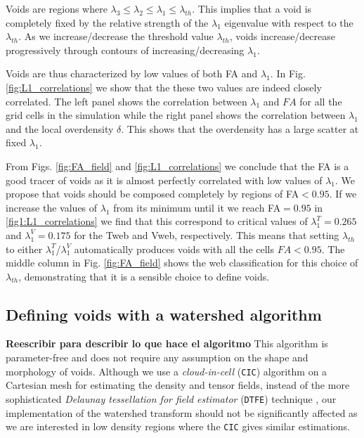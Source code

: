 \documentclass[a4,useAMS,usenatbib,usegraphicx]{latex/mn2e}
\begin{document}
Voids are regions where $\lambda_3\leq\lambda_2\leq
\lambda_1\leq\lambda_{th}$. 
This implies that a void is completely fixed by the relative strength
of the $\lambda_1$ eigenvalue with respect to the $\lambda_{th}$.   
As we  increase/decrease the threshold value $\lambda_{th}$, voids
increase/decrease progressively through contours of
increasing/decreasing $\lambda_1$.   
 
Voids are thus characterized by low values of both FA and
$\lambda_1$. 
In Fig. \ref{fig:L1_correlations} we show that the these two values
are indeed closely correlated.  
The left panel shows the correlation between $\lambda_1$ and $FA$ for
all the grid cells in the simulation while the right panel shows the
correlation between $\lambda_1$ and the local overdensity $\delta$.  
This shows that the overdensity has a large scatter at fixed
$\lambda_1$. 

From Figs. \ref{fig:FA_field} and \ref{fig:L1_correlations} we
conclude that the FA is a good tracer of voids as it is almost perfectly
correlated with low values of $\lambda_1$. 
We propose that voids should be composed completely by regions of
FA$<0.95$.
If we increase the values of $\lambda_1$ from its minimum until it
we reach FA$=0.95$ in \ref{fig1:L1_correlations} we find that this
correspond to critical values of $\lambda_{1}^T = 0.265$ and
$\lambda_{1}^V = 0.175$ for the Tweb and Vweb, respectively.
This means that setting $\lambda_{th}$ to either
$\lambda_{1}^T$/$\lambda_{1}^{V}$ automatically produces voids with
all the cells $FA<0.95$.   
The middle column in Fig. \ref{fig:FA_field} shows the web
classification for this choice of $\lambda_{th}$, demonstrating that
it is a sensible choice to define voids. 

   


\subsection{Defining voids with a watershed algorithm}
\label{sec:watershed}

{\bf Reescribir para describir lo que hace el algoritmo}
This algorithm is parameter-free and does  not require any assumption
on the shape and morphology of voids.  
Although we use a \textit{cloud-in-cell} (\texttt{CIC}) algorithm on a 
Cartesian mesh for estimating the density and tensor fields, instead of 
the more sophisticated \textit{Delaunay tessellation for field estimator} 
(\texttt{DTFE}) technique \citep{Schaap00}, our implementation of the 
watershed transform should not be significantly affected as we are 
interested in low density regions where the \texttt{CIC} gives similar 
estimations.
\end{document}
